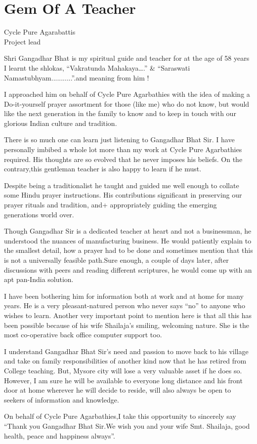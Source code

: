 \chapter{Gem Of A Teacher}

\begin{center}
\smallskip

Cycle Pure Agarabattis\\
Project lead
\end{center}
Shri Gangadhar Bhat is my spiritual guide and teacher for at the age of 58 years I learnt the shlokas, “Vakratunda Mahakaya….” \& “Saraswati Namastubhyam...........”.and meaning from him !

I approached him on behalf of Cycle Pure Agarbathies with the idea of making a Do-it-yourself prayer assortment for those (like me) who do not know, but would like the next generation in the family to know and to keep in touch with our glorious Indian culture and tradition.

There is so much one can learn just listening to Gangadhar Bhat Sir. I have personally imbibed a whole lot more than my work at Cycle Pure Agarbathies required. His thoughts are so evolved that he never imposes his beliefs. On the contrary,this gentleman teacher is also happy to learn if he must.

Despite being a traditionalist he taught and guided me well enough to collate some Hindu prayer instructions. His contributions significant in preserving our prayer rituals and tradition, and+ appropriately guiding the emerging generations world over.

Though Gangadhar Sir is a dedicated teacher at heart and not a businessman, he understood the nuances of manufacturing business. He would patiently explain to the smallest detail, how a prayer had to be done and sometimes mention that this is not a universally feasible path.Sure enough, a couple of days later, after discussions with peers and reading different scriptures, he would come up with an apt pan-India solution.

I have been bothering him for information both at work and at home for many years. He is a very pleasant-natured person who never says “no” to anyone who wishes to learn. Another very important point to mention here is that all this has been possible because of his wife Shailaja’s smiling, welcoming nature. She is the most co-operative back office computer support too. 

I understand Gangadhar Bhat Sir’s need and passion to move back to his village and take on family responsibilities of another kind now that he has retired from College teaching. But, Mysore city will lose a very valuable asset if he does so. However, I am sure he will be available to everyone long distance and his front door at home wherever he will decide to reside, will also always be open to seekers of information and knowledge.

On behalf of Cycle Pure Agarbathies,I take this opportunity to sincerely say “Thank you Gangadhar Bhat Sir.We wish you and your wife Smt. Shailaja, good health, peace and happiness always”.
